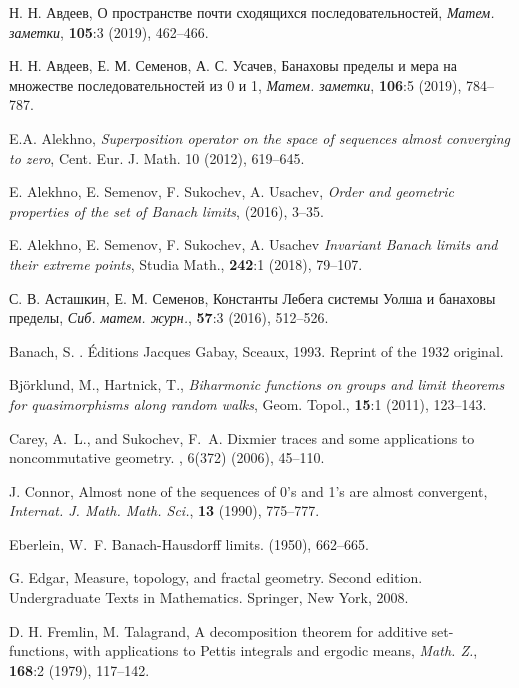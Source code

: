 \documentclass[12pt]{article}
\begin{document}
\begin{thebibliography}{10}
Н. Н. Авдеев, О пространстве почти сходящихся последовательностей,
\textit{Матем. заметки}, \textbf{105}:3 (2019),  462--466.

Н. Н. Авдеев, Е. М. Семенов, А. С. Усачев, Банаховы пределы и мера на множестве последовательностей из 0 и 1,
\textit{Матем. заметки}, \textbf{106}:5 (2019),  784--787.

{ E.A. Alekhno}, {\it Superposition operator on the space of sequences almost  converging to zero}, Cent. Eur. J. Math. {10}
 (2012), 619--645.

{ E. Alekhno, E. Semenov, F. Sukochev, A. Usachev},
\newblock  \textit{Order and geometric properties of the set of Banach
limits},
  (2016),  3--35.

E. Alekhno, E. Semenov, F. Sukochev, A. Usachev \textit{Invariant Banach limits and their extreme points}, Studia Math., \textbf{242}:1 (2018), 79--107.

С. В. Асташкин, Е. М. Семенов,  Константы Лебега системы Уолша и банаховы пределы, \emph{Сиб. матем. журн.}, \textbf{57}:3 (2016), 512--526.

{\sc Banach, S.}
.
\newblock \'Editions Jacques Gabay, Sceaux, 1993.
\newblock Reprint of the 1932 original.

Bj\"orklund, M., Hartnick, T., \textit{Biharmonic functions on groups and limit theorems for quasimorphisms along random walks}, Geom. Topol., \textbf{15}:1 (2011), 123--143.

{\sc Carey, A.~L., and Sukochev, F.~A.}
\newblock Dixmier traces and some applications to noncommutative geometry.
, 6(372) (2006), 45--110.

J. Connor, Almost none of the sequences of 0's and 1's are almost
convergent, \textit{Internat. J. Math. Math. Sci.}, \textbf{13} (1990), 775--777.

{\sc Eberlein, W.~F.}
\newblock Banach-{H}ausdorff limits.
 (1950), 662--665.

G. Edgar, Measure, topology, and fractal geometry. Second edition. Undergraduate Texts in Mathematics. Springer, New York, 2008.

D. H. Fremlin, M. Talagrand,
A decomposition theorem for additive set-functions, with applications to Pettis integrals and ergodic means,
\textit{Math. Z.}, \textbf{168}:2 (1979), 117--142.


\end{thebibliography}
\end{document}
